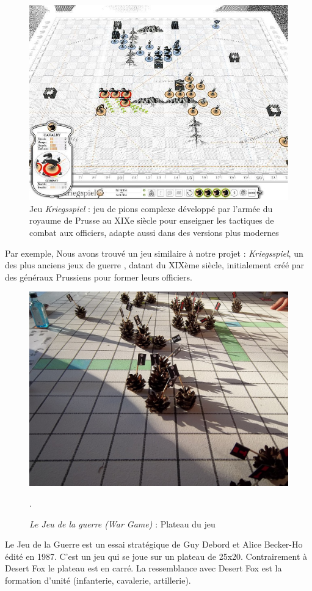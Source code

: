 \begin{figure}[H]
\centering
\includegraphics[scale=0.5]{data/kriegspiel.jpeg}
\caption{Jeu \textit{Kriegsspiel} : jeu de pions complexe développé par l'armée du royaume de Prusse au XIXe siècle pour enseigner les tactiques de combat aux officiers, adapte aussi dans des versions plus modernes \cite{livermore1879american}}
\end{figure}

Par exemple, Nous avons trouvé un jeu similaire à notre projet : \textit{Kriegsspiel}, un des plus anciens jeux de guerre , datant du XIXème siècle, initialement créé par des généraux Prussiens pour former leurs officiers.

\begin{figure}[H]
\centering
\includegraphics[scale=0.2]{data/Cavalry_at_dusk,.jpg}
\caption{\textit{Le Jeu de la guerre (War Game)} : Plateau du jeu}.
\end{figure}

Le Jeu de la Guerre \cite{frwiki:189457170} est un essai stratégique de Guy Debord et Alice Becker-Ho édité en 1987.
C'est un jeu qui se joue sur un plateau de 25x20. Contrairement à Desert Fox le plateau est en carré. La ressemblance avec Desert Fox est la formation d'unité (infanterie, cavalerie, artillerie).
